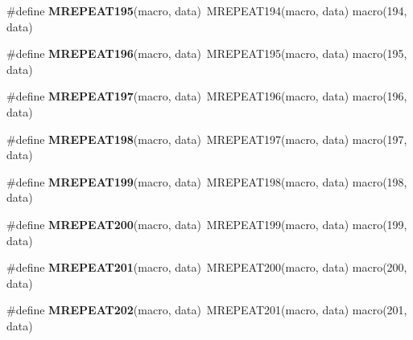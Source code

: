 \begin{DoxyCompactItemize}
\item 
\hypertarget{group__group__xmega__utils__mrepeat_ga9b1f8ebc91ab6f86e156010f11811cfa}{\#define {\bfseries M\-R\-E\-P\-E\-A\-T195}(macro, data)~M\-R\-E\-P\-E\-A\-T194(macro, data)   macro(194, data)}\label{group__group__xmega__utils__mrepeat_ga9b1f8ebc91ab6f86e156010f11811cfa}

\item 
\hypertarget{group__group__xmega__utils__mrepeat_ga960fa8ced64817d70ae389a75693f351}{\#define {\bfseries M\-R\-E\-P\-E\-A\-T196}(macro, data)~M\-R\-E\-P\-E\-A\-T195(macro, data)   macro(195, data)}\label{group__group__xmega__utils__mrepeat_ga960fa8ced64817d70ae389a75693f351}

\item 
\hypertarget{group__group__xmega__utils__mrepeat_ga8d5a1466ff85f6b12ce43dd9a5edf7e5}{\#define {\bfseries M\-R\-E\-P\-E\-A\-T197}(macro, data)~M\-R\-E\-P\-E\-A\-T196(macro, data)   macro(196, data)}\label{group__group__xmega__utils__mrepeat_ga8d5a1466ff85f6b12ce43dd9a5edf7e5}

\item 
\hypertarget{group__group__xmega__utils__mrepeat_ga4061c0d7ba556ac993f2bcca14dd479c}{\#define {\bfseries M\-R\-E\-P\-E\-A\-T198}(macro, data)~M\-R\-E\-P\-E\-A\-T197(macro, data)   macro(197, data)}\label{group__group__xmega__utils__mrepeat_ga4061c0d7ba556ac993f2bcca14dd479c}

\item 
\hypertarget{group__group__xmega__utils__mrepeat_gae89c87df1febe41c657bbbff536a77fa}{\#define {\bfseries M\-R\-E\-P\-E\-A\-T199}(macro, data)~M\-R\-E\-P\-E\-A\-T198(macro, data)   macro(198, data)}\label{group__group__xmega__utils__mrepeat_gae89c87df1febe41c657bbbff536a77fa}

\item 
\hypertarget{group__group__xmega__utils__mrepeat_gad87de52b3036ad813d9f01fe6dc57d38}{\#define {\bfseries M\-R\-E\-P\-E\-A\-T200}(macro, data)~M\-R\-E\-P\-E\-A\-T199(macro, data)   macro(199, data)}\label{group__group__xmega__utils__mrepeat_gad87de52b3036ad813d9f01fe6dc57d38}

\item 
\hypertarget{group__group__xmega__utils__mrepeat_gae15bf8ac240e5b8bb7d7fc73c7b58e41}{\#define {\bfseries M\-R\-E\-P\-E\-A\-T201}(macro, data)~M\-R\-E\-P\-E\-A\-T200(macro, data)   macro(200, data)}\label{group__group__xmega__utils__mrepeat_gae15bf8ac240e5b8bb7d7fc73c7b58e41}

\item 
\hypertarget{group__group__xmega__utils__mrepeat_ga5a2a3af10439763667d2adee22e01fff}{\#define {\bfseries M\-R\-E\-P\-E\-A\-T202}(macro, data)~M\-R\-E\-P\-E\-A\-T201(macro, data)   macro(201, data)}\label{group__group__xmega__utils__mrepeat_ga5a2a3af10439763667d2adee22e01fff}


\end{DoxyCompactItemize}
